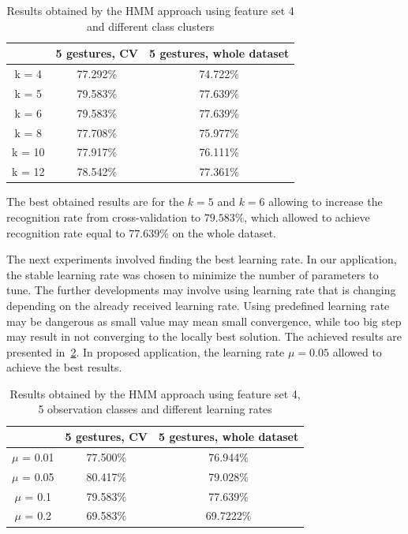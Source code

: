 \begin{table}[htp!]
	\label{tab:dyn1}
	\caption{Results obtained by the HMM approach using feature set 4 and different class clusters}
    \begin{tabular}{|c|c|c|}
    \hline
    ~                                 & 5 gestures, CV & 5 gestures, whole dataset  \\ \hline
	k = 4                  	  & 77.292\% & 74.722\%   \\ \hline
    k = 5               	  & 79.583\% & 77.639\%   \\ \hline
    k = 6                     & 79.583\% & 77.639\%   \\ \hline
    k = 8                     & 77.708\% & 75.977\%   \\ \hline
    k = 10                    & 77.917\% & 76.111\%   \\ \hline
    k = 12                    & 78.542\% & 77.361\%   \\ \hline
    \end{tabular}
\end{table}
The best obtained results are for the $k=5$ and $k=6$ allowing to increase the recognition rate from cross-validation to $79.583\%$, which allowed to achieve recognition rate equal to $77.639\%$ on the whole dataset. 



The next experiments involved finding the best learning rate. 
In our application, the stable learning rate was chosen to minimize the number of parameters to tune. 
The further developments may involve using learning rate that is changing depending on the already received learning rate.
Using predefined learning rate may be dangerous as small value may mean small convergence, while too big step may result in not converging to the locally best solution. 
The achieved results are presented in~\ref{tab:dyn2}.
In proposed application, the learning rate $\mu = 0.05$ allowed to achieve the best results. 

\begin{table}[htp!]
	\label{tab:dyn2}
	\caption{Results obtained by the HMM approach using feature set 4, 5 observation classes and different learning rates}
    \begin{tabular}{|c|c|c|}
    \hline
    ~                                 & 5 gestures, CV & 5 gestures, whole dataset  \\ \hline
	$\mu$ = 0.01                  	  & 77.500\% & 76.944\%   \\ \hline
    $\mu$ = 0.05                      & 80.417\% & 79.028\%   \\ \hline
    $\mu$ = 0.1                      & 79.583\% & 77.639\%   \\ \hline
    $\mu$ = 0.2                      & 69.583\% & 69.7222\%   \\ \hline
    \end{tabular}
\end{table}


